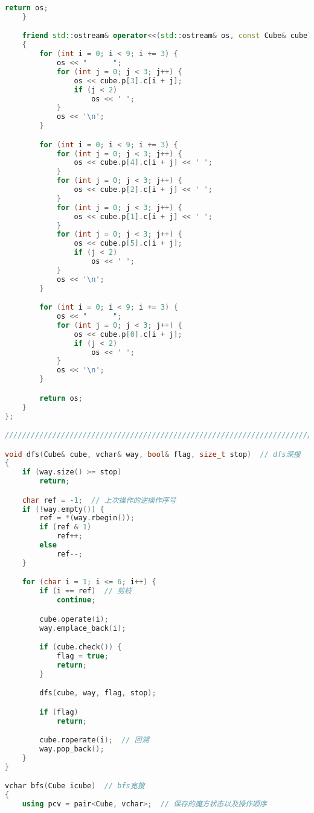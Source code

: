 \begin{lstlisting}[language=C++]
        return os;
    }

    friend std::ostream& operator<<(std::ostream& os, const Cube& cube)  // 输出，本题非必要
    {
        for (int i = 0; i < 9; i += 3) {
            os << "      ";
            for (int j = 0; j < 3; j++) {
                os << cube.p[3].c[i + j];
                if (j < 2)
                    os << ' ';
            }
            os << '\n';
        }

        for (int i = 0; i < 9; i += 3) {
            for (int j = 0; j < 3; j++) {
                os << cube.p[4].c[i + j] << ' ';
            }
            for (int j = 0; j < 3; j++) {
                os << cube.p[2].c[i + j] << ' ';
            }
            for (int j = 0; j < 3; j++) {
                os << cube.p[1].c[i + j] << ' ';
            }
            for (int j = 0; j < 3; j++) {
                os << cube.p[5].c[i + j];
                if (j < 2)
                    os << ' ';
            }
            os << '\n';
        }

        for (int i = 0; i < 9; i += 3) {
            os << "      ";
            for (int j = 0; j < 3; j++) {
                os << cube.p[0].c[i + j];
                if (j < 2)
                    os << ' ';
            }
            os << '\n';
        }

        return os;
    }
};

/////////////////////////////////////////////////////////////////////////////////

void dfs(Cube& cube, vchar& way, bool& flag, size_t stop)  // dfs深搜
{
    if (way.size() >= stop)
        return;

    char ref = -1;  // 上次操作的逆操作序号
    if (!way.empty()) {
        ref = *(way.rbegin());
        if (ref & 1)
            ref++;
        else
            ref--;
    }

    for (char i = 1; i <= 6; i++) {
        if (i == ref)  // 剪枝
            continue;

        cube.operate(i);
        way.emplace_back(i);

        if (cube.check()) {
            flag = true;
            return;
        }

        dfs(cube, way, flag, stop);

        if (flag)
            return;

        cube.roperate(i);  // 回溯
        way.pop_back();
    }
}

vchar bfs(Cube icube)  // bfs宽搜
{
    using pcv = pair<Cube, vchar>;  // 保存的魔方状态以及操作顺序


\end{lstlisting}
